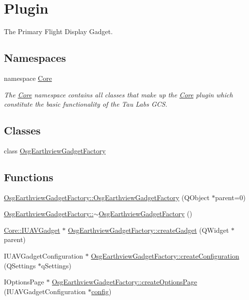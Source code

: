 \hypertarget{group___osg_earthview}{\section{Plugin}
\label{group___osg_earthview}
}


The Primary Flight Display Gadget.  


\subsection*{Namespaces}
\begin{DoxyCompactItemize}
\item 
namespace \hyperlink{namespace_core}{Core}
\begin{DoxyCompactList}\small\item\em The \hyperlink{namespace_core}{Core} namespace contains all classes that make up the \hyperlink{namespace_core}{Core} plugin which constitute the basic functionality of the Tau Labs G\-C\-S. \end{DoxyCompactList}\end{DoxyCompactItemize}
\subsection*{Classes}
\begin{DoxyCompactItemize}
\item 
class \hyperlink{class_osg_earthview_gadget_factory}{Osg\-Earthview\-Gadget\-Factory}
\end{DoxyCompactItemize}
\subsection*{Functions}
\begin{DoxyCompactItemize}
\item 
\hyperlink{group___osg_earthview_ga80b08d5dc72dc33d68fb003039d09e79}{Osg\-Earthview\-Gadget\-Factory\-::\-Osg\-Earthview\-Gadget\-Factory} (Q\-Object $\ast$parent=0)
\item 
\hyperlink{group___osg_earthview_ga3287ca5ea93e70d691a0f8f3ed84e4c9}{Osg\-Earthview\-Gadget\-Factory\-::$\sim$\-Osg\-Earthview\-Gadget\-Factory} ()
\item 
\hyperlink{class_core_1_1_i_u_a_v_gadget}{Core\-::\-I\-U\-A\-V\-Gadget} $\ast$ \hyperlink{group___osg_earthview_gaf6044184a496af6c6c7c50c271a6ceef}{Osg\-Earthview\-Gadget\-Factory\-::create\-Gadget} (Q\-Widget $\ast$parent)
\item 
I\-U\-A\-V\-Gadget\-Configuration $\ast$ \hyperlink{group___osg_earthview_ga863730abedc7eb805c2f5f9201aadfdc}{Osg\-Earthview\-Gadget\-Factory\-::create\-Configuration} (Q\-Settings $\ast$q\-Settings)
\item 
I\-Options\-Page $\ast$ \hyperlink{group___osg_earthview_ga809eda563b3d5d297fc14507d28a122d}{Osg\-Earthview\-Gadget\-Factory\-::create\-Options\-Page} (I\-U\-A\-V\-Gadget\-Configuration $\ast$\hyperlink{deflate_8c_a4473b5227787415097004fd39f55185e}{config})
\end{DoxyCompactItemize}


